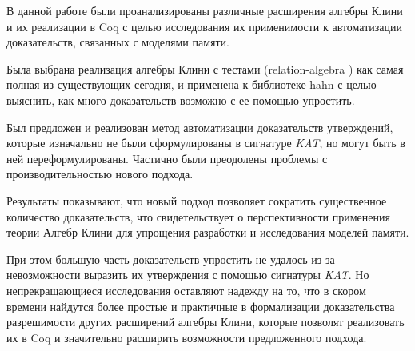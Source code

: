 \documentclass[times
              ,specification
              ,annotation
              ]{itmo-student-thesis}
\begin{document}
  В данной работе были проанализированы различные расширения алгебры Клини и их реализации в Coq
  с целью исследования их применимости к автоматизации доказательств, связанных с моделями памяти.

  Была выбрана реализация алгебры Клини с тестами (relation-algebra \cite{kat}) как самая полная из
  существующих сегодня, и применена к
  библиотеке hahn с целью выяснить, как много доказательств возможно с ее помощью упростить.

  Был предложен и реализован метод автоматизации доказательств утверждений, которые изначально не
  были сформулированы в сигнатуре \textit{KAT}, но могут быть в ней переформулированы.
  Частично были преодолены проблемы с производительностью нового подхода.

  Результаты показывают, что новый подход позволяет сократить существенное количество доказательств,
  что свидетельствует о перспективности применения теории Алгебр Клини для упрощения разработки и
  исследования моделей памяти.

  При этом большую часть доказательств упростить не удалось из-за невозможности выразить их
  утверждения с помощью сигнатуры \textit{KAT}.
  Но непрекращающиеся исследования оставляют надежду на то, что в скором времени найдутся более простые и
  практичные в формализации доказательства разрешимости других расширений алгебры Клини, которые
  позволят реализовать их в Coq и значительно расширить возможности предложенного подхода.

\printmainbibliography

\appendix

\end{document}
